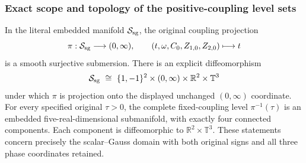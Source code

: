 \subsubsection{Exact scope and topology of the positive-coupling level sets}

\begin{corollary}
\label{sgd:smooth-addon:levels}
In the literal embedded manifold $\mathcal S_{\rm sg}$, the
original coupling projection
\[
 \pi:\mathcal S_{\rm sg}\longrightarrow(0,\infty),\qquad
 (t,\omega,C_0,Z_{1,0},Z_{2,0})\longmapsto t
\]
is a smooth surjective submersion. There is an explicit diffeomorphism
\begin{equation}
 \mathcal S_{\rm sg}
 \ \cong\
 \{1,-1\}^2\times(0,\infty)\times\mathbb R^2\times\mathbb T^3
 \label{sgd:smooth-addon:global-product}
\end{equation}
under which $\pi$ is projection onto the displayed unchanged
$(0,\infty)$ coordinate.
For every specified original $\tau>0$, the complete fixed-coupling
level $\pi^{-1}(\tau)$ is an embedded five-real-dimensional
submanifold, with exactly four connected components.
Each component is diffeomorphic to $\mathbb R^2\times\mathbb T^3$.
These statements concern precisely the scalar--Gauss domain with
both original signs and all three phase coordinates retained.
\end{corollary}
